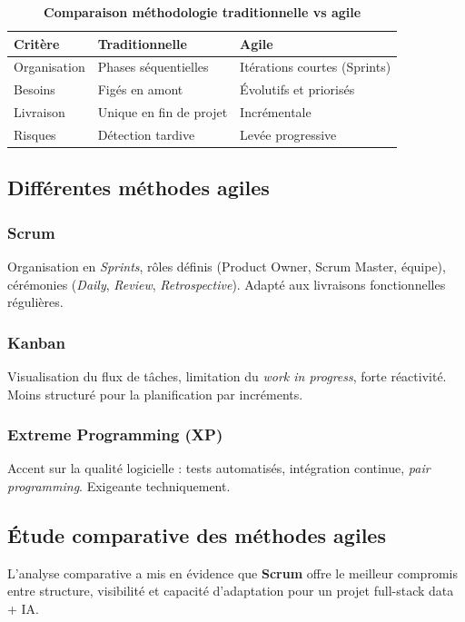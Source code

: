 \documentclass[12pt,a4paper]{report}
\begin{document}
\begin{table}[H]\centering\caption{\textbf{Comparaison méthodologie traditionnelle vs agile}}\label{tab:comparaison_methodologies}
\renewcommand{\arraystretch}{1.15}
\begin{tabular}{|p{3.3cm}|p{5.8cm}|p{5.8cm}|}
\hline\rowcolor[RGB]{220,0,0}\color{white}\textbf{Critère}&\color{white}\textbf{Traditionnelle}&\color{white}\textbf{Agile}\\\hline
Organisation & Phases séquentielles & Itérations courtes (Sprints) \\\hline
Besoins & Figés en amont & Évolutifs et priorisés \\\hline
Livraison & Unique en fin de projet & Incrémentale \\\hline
Risques & Détection tardive & Levée progressive \\\hline
\end{tabular}\end{table}

\subsection{Différentes méthodes agiles}\label{sec:ch1-agiles}

\subsubsection{Scrum}
Organisation en \textit{Sprints}, rôles définis (Product Owner, Scrum Master, équipe), cérémonies (\textit{Daily}, \textit{Review}, \textit{Retrospective}). Adapté aux livraisons fonctionnelles régulières.

\subsubsection{Kanban}
Visualisation du flux de tâches, limitation du \textit{work in progress}, forte réactivité. Moins structuré pour la planification par incréments.

\subsubsection{Extreme Programming (XP)}
Accent sur la qualité logicielle : tests automatisés, intégration continue, \textit{pair programming}. Exigeante techniquement.

\subsection{Étude comparative des méthodes agiles}\label{sec:ch1-comparatif}
L'analyse comparative a mis en évidence que \textbf{Scrum} offre le meilleur compromis entre structure, visibilité et capacité d'adaptation pour un projet full-stack data + IA.
\end{document}
